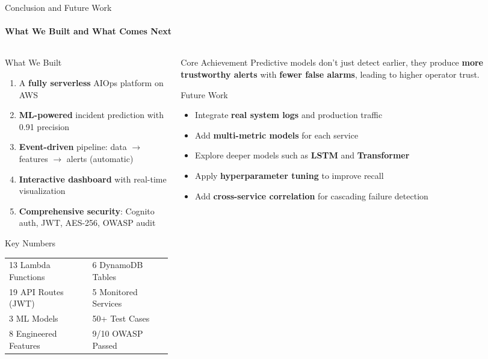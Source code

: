 \documentclass[aspectratio=169,11pt]{beamer}
\begin{document}
\begin{frame}[shrink=14]{Conclusion and Future Work}
\framesubtitle{What We Built and What Comes Next}

\begin{columns}[T]
\begin{column}{0.56\textwidth}
\begin{block}{What We Built}
\begin{enumerate}
    \item A \textbf{fully serverless} AIOps platform on AWS
    \item \textbf{ML-powered} incident prediction with 0.91 precision
    \item \textbf{Event-driven} pipeline: data $\rightarrow$ features $\rightarrow$ alerts (automatic)
    \item \textbf{Interactive dashboard} with real-time visualization
    \item \textbf{Comprehensive security}: Cognito auth, JWT, AES-256, OWASP audit
\end{enumerate}
\end{block}

\vspace{0.25em}
\begin{block}{Key Numbers}
{\small
\begin{tabular}{ll}
13 Lambda Functions & 6 DynamoDB Tables \\
19 API Routes (JWT) & 5 Monitored Services \\
3 ML Models & 50+ Test Cases \\
8 Engineered Features & 9/10 OWASP Passed \\
\end{tabular}
}
\end{block}
\end{column}

\begin{column}{0.40\textwidth}
\begin{alertblock}{Core Achievement}
{\small Predictive models don't just detect earlier, they produce \textbf{more trustworthy alerts} with \textbf{fewer false alarms}, leading to higher operator trust.}
\end{alertblock}

\vspace{0.25em}
\begin{block}{Future Work}
{\small
\begin{itemize}
    \item Integrate \textbf{real system logs} and production traffic
    \item Add \textbf{multi-metric models} for each service
    \item Explore deeper models such as \textbf{LSTM} and \textbf{Transformer}
    \item Apply \textbf{hyperparameter tuning} to improve recall
    \item Add \textbf{cross-service correlation} for cascading failure detection
\end{itemize}
}
\end{block}
\end{column}
\end{columns}

\end{frame}
\end{document}
